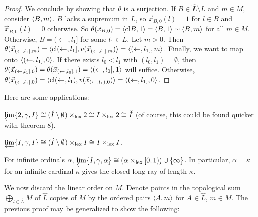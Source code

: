 \documentclass[11pt]{article}
\renewcommand{\cl}{\textrm{cl}}
\newcommand{\lexTimes}{\times_{\textrm{lex}}}
\newcommand{\vect}{\vec}
\begin{document}
\begin{proof}
    We conclude by
    showing that \(\theta\) is a surjection. If \(B\in\hat L\setminus L\)
    and \(m\in M\), consider \(\langle B,m\rangle\).
    \(B\) lacks a supremum in \(L\), so
    \(\vect x_{B,0}(l)=1\) for \(l\in B\) and \(\vect x_{B,0}(l)=0\) otherwise.
    So \(\theta(\vect x_{B,0})=\<\cl B,1\>=\<B,1\>\sim\<B,m\>\) for all
    \(m\in M\). Otherwise, \(B=(\leftarrow,l_1]\) for some \(l_1\in L\).
    Let \(m>0\).
    Then
    \(
      \theta(\vect x_{(\leftarrow,l_1],m})
        =
      \<\cl (\leftarrow,l_1],v(\vect x_{(\leftarrow,l_1],m})\>
        =
      \<(\leftarrow,l_1],m\>
    \).
    Finally, we want to map onto \(\langle(\leftarrow,l_1],0\rangle\).
    If there exists \(l_0<l_1\) with \((l_0,l_1)=\emptyset\), then
    \(
      \theta(\vect x_{(\leftarrow,l_1],0})
        =
      \theta(\vect x_{(\leftarrow,l_0],1})
        =
      \<(\leftarrow,l_0],1\>
    \)
    will suffice. Otherwise,
    \(
      \theta(\vect x_{(\leftarrow,l_1],0})
        =
      \<\cl (\leftarrow,l_1),v(\vect x_{(\leftarrow,l_1),0})\>
        =
      \<(\leftarrow,l_1],0\>
    \).
  \end{proof}

  Here are some applications:

  \begin{example}
    \(
      \varprojlim\{2,\gamma,I\}
        \cong
      (\hat I\setminus\emptyset)\lexTimes 2
        \cong
      I\lexTimes 2
        \cong
      \check I
    \) (of course, this could be found quicker with theorem 8).
  \end{example}

  \begin{example}
    \(
      \varprojlim\{I,\gamma,I\}
        \cong
      (\hat I\setminus\emptyset)\lexTimes I
        \cong
      I\lexTimes I
    \).
  \end{example}

  \begin{example}
    For infinite ordinals \(\alpha\),
    \(
      \varprojlim\{I,\gamma,\alpha\}
        \cong
      (\alpha\lexTimes[0,1))\cup\{\infty\}
    \).
    In particular, \(\alpha=\kappa\) for an infinite cardinal \(\kappa\)
    gives the closed long ray of length \(\kappa\).
  \end{example}



  We now discard the linear order on \(M\). Denote points in the topological
  sum \(\bigoplus_{l\in \hat L} M\) of \(\hat L\) copies of \(M\)
  by the ordered pairs \(\langle A,m\rangle\)
  for \(A\in \hat L\), \(m\in M\). The previous proof may be generalized to
  show the following:
\end{document}

